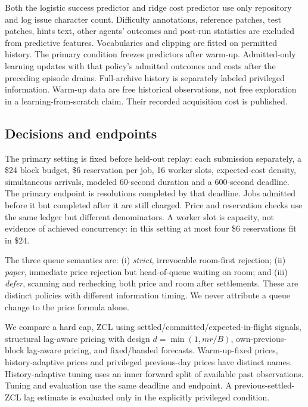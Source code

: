 \documentclass[11pt]{article}
\begin{document}
Both the logistic success predictor and ridge cost predictor use only repository and log issue character count. Difficulty annotations, reference patches, test patches, hints text, other agents' outcomes and post-run statistics are excluded from predictive features. Vocabularies and clipping are fitted on permitted history. The primary condition freezes predictors after warm-up. Admitted-only learning updates with that policy's admitted outcomes and costs after the preceding episode drains. Full-archive history is separately labeled privileged information. Warm-up data are free historical observations, not free exploration in a learning-from-scratch claim. Their recorded acquisition cost is published.

\subsection{Decisions and endpoints}
The primary setting is fixed before held-out replay: each submission separately, a \$24 block budget, \$6 reservation per job, 16 worker slots, expected-cost density, simultaneous arrivals, modeled 60-second duration and a 600-second deadline. The primary endpoint is resolutions completed by that deadline. Jobs admitted before it but completed after it are still charged. Price and reservation checks use the same ledger but different denominators. A worker slot is capacity, not evidence of achieved concurrency: in this setting at most four \$6 reservations fit in \$24.

The three queue semantics are: (i) \emph{strict}, irrevocable room-first rejection; (ii) \emph{paper}, immediate price rejection but head-of-queue waiting on room; and (iii) \emph{defer}, scanning and rechecking both price and room after settlements. These are distinct policies with different information timing. We never attribute a queue change to the price formula alone.

We compare a hard cap, ZCL using settled/committed/expected-in-flight signals, structural lag-aware pricing with design $d=\min(1,mr/B)$, own-previous-block lag-aware pricing, and fixed/banded forecasts. Warm-up-fixed prices, history-adaptive prices and privileged previous-day prices have distinct names. History-adaptive tuning uses an inner forward split of available past observations. Tuning and evaluation use the same deadline and endpoint. A previous-settled-ZCL lag estimate is evaluated only in the explicitly privileged condition.
\end{document}
